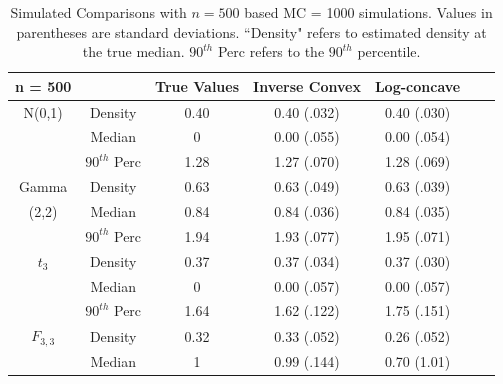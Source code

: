 \documentclass[11pt]{article}
\numberwithin{equation}{section}
\begin{document}
\begin{table}

\begin{center}	
\caption[Simulated Comparisons for Inverse Convex and Log-concave Estimators with $n = 500$]{Simulated Comparisons with $n = 500$ based MC = 1000 simulations. Values in parentheses are standard deviations. ``Density" refers to estimated density at the true median. $90^{th}$ Perc refers to the $90^{th}$ percentile.}

\begin{tabular} {| c | c | c | c | c | c | c |} 


	 \hline
	 
	 n = 500 		& 			&	True Values	& Inverse Convex		&	Log-concave	\\
	 
	 \hline
	 
	N(0,1) 		& Density		& 	0.40			& 	0.40 (.032)		&	0.40 (.030)	\\
	 
	 
		 		& Median 		&	0			& 	0.00 (.055)		&	0.00 (.054)	  \\ 
					
				& $90^{th}$ Perc&	1.28			& 	1.27 (.070)		&	1.28 (.069)	\\
	
	\hline

	 
	 Gamma	 	& Density		& 	0.63			& 	0.63 (.049)		&	0.63 (.039)	\\
	 
	 
	 (2,2)			& Median 		&	0.84			& 	0.84 (.036)		& 	0.84 (.035)	 \\ 
				
				& $90^{th}$ Perc&	1.94			& 	1.93 (.077)		&	1.95 (.071)	 \\
	
	\hline
		
	 
	 $t_3$	 	& Density		& 	0.37			& 	0.37 (.034)		&	0.37 (.030)	\\
	 
	 
	 			& Median 		&	0			& 	0.00 (.057)		& 	0.00 (.057)	  \\ 
				
				& $90^{th}$ Perc&	1.64			& 	1.62 (.122)		&	1.75 (.151)	 \\
	
	\hline
	
		 
	 $F_{3,3}$	 	& Density		& 	0.32			&  	0.33 (.052)		&	0.26 (.052)	\\
	 
	 
	 			& Median 		&	1			& 	0.99 (.144)		& 	0.70 (1.01)	 \\ 
				

\end{tabular}
\end{center}
\end{table}
\end{document}
